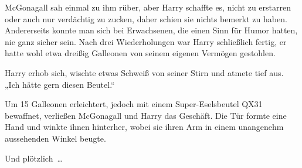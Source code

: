 McGonagall sah einmal zu ihm rüber, aber Harry schaffte es, nicht zu erstarren oder auch nur verdächtig zu zucken, daher schien sie nichts bemerkt zu haben. Andererseits konnte man sich bei Erwachsenen, die einen Sinn für Humor hatten, nie ganz sicher sein.
Nach drei Wiederholungen war Harry schließlich fertig, er hatte wohl etwa dreißig Galleonen von seinem eigenen Vermögen gestohlen.

Harry erhob sich, wischte etwas Schweiß von seiner Stirn und atmete tief aus. „Ich hätte gern diesen Beutel.“

Um 15 Galleonen erleichtert, jedoch mit einem Super-Eselsbeutel QX31 bewaffnet, verließen McGonagall und Harry das Geschäft. Die Tür formte eine Hand und winkte ihnen hinterher, wobei sie ihren Arm in einem unangenehm aussehenden Winkel beugte.

Und plötzlich …

